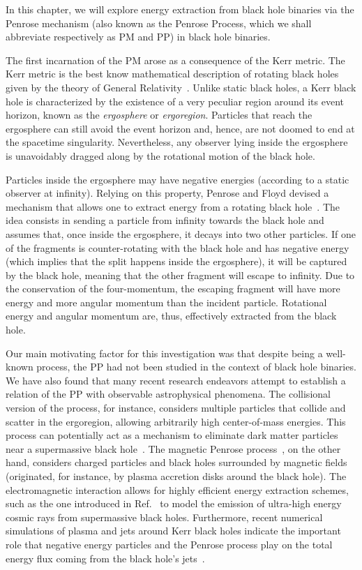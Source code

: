 In this chapter, we will explore energy extraction from black hole binaries via the Penrose mechanism (also known as the Penrose Process, which we shall abbreviate respectively as PM and PP) in black hole binaries.

The first incarnation of the PM arose as a consequence of the Kerr metric. The Kerr metric is the best know mathematical description of rotating black holes given by the theory of General Relativity~\cite{Visser:2007fj,Bambi:2011mj,Teukolsky:2014vca,berti}. Unlike static black holes, a Kerr black hole is characterized by the existence of a very peculiar region around its event horizon, known as the \emph{ergosphere} or \emph{ergoregion}. Particles that reach the ergosphere can still avoid the event horizon and, hence, are not doomed to end at the spacetime singularity. Nevertheless, any observer lying inside the ergosphere is unavoidably dragged along by the rotational motion of the black hole.

Particles inside the ergosphere may have negative energies (according to a static observer at infinity). Relying on this property, Penrose and Floyd devised a mechanism that allows one to extract energy from a rotating black hole~\cite{PENROSE1971}. The idea consists in sending a particle from infinity towards the black hole and assumes that, once inside the ergosphere, it decays into two other particles. If one of the fragments is counter-rotating with the black hole and has negative energy (which implies that the split happens inside the ergosphere), it will be captured by the black hole, meaning that the other fragment will escape to infinity. Due to the conservation of the four-momentum, the escaping fragment will have more energy and more angular momentum than the incident particle. Rotational energy and angular momentum are, thus, effectively extracted from the black hole.

Our main motivating factor for this investigation was that despite being a well-known process, the PP had not been studied in the context of black hole binaries. We have also found that many recent research endeavors attempt to establish a relation of the PP with observable astrophysical phenomena. The collisional version of the process, for instance, considers multiple particles that collide and scatter in the ergoregion, allowing  arbitrarily high center-of-mass energies. This process can potentially act as a mechanism to eliminate dark matter particles near a supermassive black hole~\cite{Schnittman:2018ccg}. The magnetic Penrose process~\cite{Wagh1985,Tursunov:2019oiq}, on the other hand, considers charged particles and black holes surrounded by magnetic fields (originated, for instance, by plasma accretion disks around the black hole). The electromagnetic interaction allows for highly efficient energy extraction schemes, such as the one introduced in Ref.~\cite{Tursunov:2020juz} to model the emission of ultra-high energy cosmic rays from supermassive black holes. Furthermore, recent numerical simulations of plasma and jets around Kerr black holes indicate the important role that negative energy particles and the Penrose process play on the total energy flux coming from the black hole's jets~\cite{Parfrey:2018dnc}.

